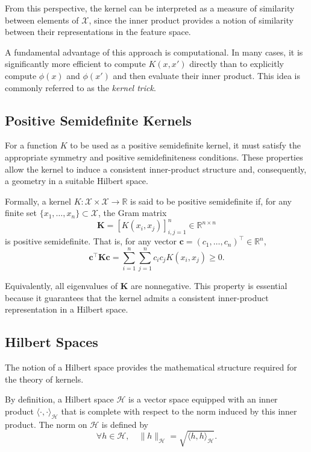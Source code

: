 From this perspective, the kernel can be interpreted as a measure of
similarity between elements of $\mathcal{X}$, since the inner product
provides a notion of similarity between their representations in the
feature space.

A fundamental advantage of this approach is computational. In many cases,
it is significantly more efficient to compute $K(x,x')$ directly than to
explicitly compute $\phi(x)$ and $\phi(x')$ and then evaluate their inner
product. This idea is commonly referred to as the \textit{kernel trick}.

\subsection{Positive Semidefinite Kernels}

For a function $K$ to be used as a positive semidefinite kernel, it must
satisfy the appropriate symmetry and positive semidefiniteness conditions.
These properties allow the kernel to induce a consistent inner-product
structure and, consequently, a geometry in a suitable Hilbert space.

Formally, a kernel $K: \mathcal{X} \times \mathcal{X} \to \mathbb{R}$ is
said to be positive semidefinite if, for any finite set
$\{x_1, \ldots, x_n\} \subset \mathcal{X}$, the Gram matrix
\begin{equation}
\mathbf{K} = [K(x_i,x_j)]_{i,j=1}^n
\in \mathbb{R}^{n \times n}
\end{equation}
is positive semidefinite. That is, for any vector
$\mathbf{c}=(c_1,\ldots,c_n)^\top \in \mathbb{R}^n$,
\begin{equation}
\mathbf{c}^\top \mathbf{K}\mathbf{c}
=
\sum_{i=1}^n \sum_{j=1}^n
c_i c_j K(x_i,x_j)
\geq 0.
\end{equation}

Equivalently, all eigenvalues of $\mathbf{K}$ are nonnegative. This
property is essential because it guarantees that the kernel admits a
consistent inner-product representation in a Hilbert space.
\subsection{Hilbert Spaces}

The notion of a Hilbert space provides the mathematical structure required
for the theory of kernels.

By definition, a Hilbert space $\mathcal{H}$ is a vector space equipped with
an inner product $\langle \cdot, \cdot \rangle_{\mathcal{H}}$ that is complete
with respect to the norm induced by this inner product. The norm on
$\mathcal{H}$ is defined by
\begin{equation}
\forall h \in \mathcal{H}, \quad
\|h\|_{\mathcal{H}}
=
\sqrt{\langle h,h\rangle_{\mathcal{H}}}.
\end{equation}

